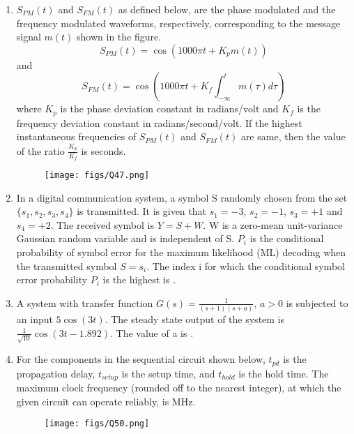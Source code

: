 \documentclass[a4paper, 11pt]{article}
\begin{document}
\begin{enumerate}
    \hfill{}

    \item $S_{PM}(t)$ and $S_{FM}(t)$ as defined below, are the phase modulated and the frequency modulated waveforms, respectively, corresponding to the message signal $m(t)$ shown in the figure.
    $$S_{PM}(t) = \cos(1000\pi t + K_p m(t))$$
    and
    $$S_{FM}(t) = \cos\left(1000\pi t + K_f \int_{-\infty}^{t} m(\tau)d\tau\right)$$
    where $K_p$ is the phase deviation constant in radians/volt and $K_f$ is the frequency deviation constant in radians/second/volt. If the highest instantaneous frequencies of $S_{PM}(t)$ and $S_{FM}(t)$ are same, then the value of the ratio $\frac{K_p}{K_f}$ is \underline{\hspace{2cm}} seconds.
    \begin{figure}[H]
        \centering
        \texttt{[image: figs/Q47.png]}
        \caption*{}
        \label{fig:q57}
    \end{figure}

    \hfill{}

    \item In a digital communication system, a symbol S randomly chosen from the set $\{s_1, s_2, s_3, s_4\}$ is transmitted. It is given that $s_1 = -3$, $s_2 = -1$, $s_3 = +1$ and $s_4 = +2$. The received symbol is $Y = S+W$. W is a zero-mean unit-variance Gaussian random variable and is independent of S. $P_i$ is the conditional probability of symbol error for the maximum likelihood (ML) decoding when the transmitted symbol $S=s_i$. The index i for which the conditional symbol error probability $P_i$ is the highest is \underline{\hspace{2cm}}.

    \hfill{}

    \item A system with transfer function $G(s) = \frac{1}{(s+1)(s+a)}$, $a>0$ is subjected to an input $5\cos(3t)$. The steady state output of the system is $\frac{1}{\sqrt{10}}\cos(3t-1.892)$. The value of a is \underline{\hspace{2cm}}.

    \hfill{}

    \item For the components in the sequential circuit shown below, $t_{pd}$ is the propagation delay, $t_{setup}$ is the setup time, and $t_{hold}$ is the hold time. The maximum clock frequency (rounded off to the nearest integer), at which the given circuit can operate reliably, is \underline{\hspace{2cm}} MHz.
    \begin{figure}[H]
        \centering
        \texttt{[image: figs/Q50.png]}
        \caption*{}
        \label{fig:q60}
    \end{figure}


\end{enumerate}
\end{document}
